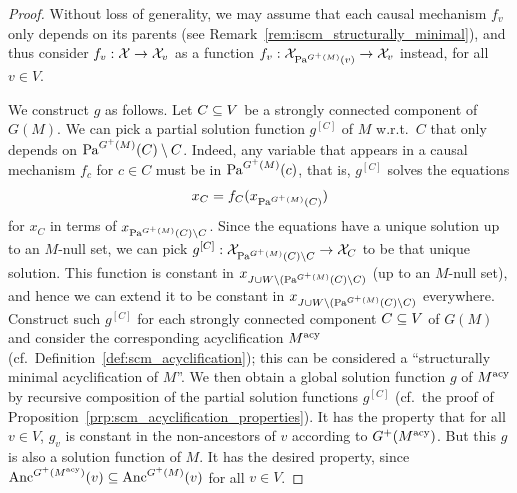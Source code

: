 \begin{proof}
  Without loss of generality, we may assume that each causal mechanism $f_v$ only depends on its parents (see Remark~\ref{rem:iscm_structurally_minimal}), and thus consider $f_v : \mathcal{X} \to \mathcal{X}_v$ as a function $f_v : \mathcal{X}_{\mathrm{Pa}^{G^+(M)}(v)} \to \mathcal{X}_v$ instead, for all $v \in V$.

  We construct $g$ as follows.
  Let $C \subseteq V$ be a strongly connected component of $G(M)$.
  We can pick a partial solution function $g^{[C]}$ of $M$ w.r.t.\ $C$ that only depends on $\mathrm{Pa}^{G^+(M)}(C) \setminus C$.
  Indeed, any variable that appears in a causal mechanism $f_c$ for $c \in C$ must be in $\mathrm{Pa}^{G^+(M)}(c)$, that is, $g^{[C]}$ solves the equations
  $$x_C = f_C(x_{\mathrm{Pa}^{G^+(M)}(C)})$$
  for $x_C$ in terms of $x_{\mathrm{Pa}^{G^+(M)}(C) \setminus C}$.
  Since the equations have a unique solution up to an $M$-null set, we can pick $g^{[C]} : \mathcal{X}_{\mathrm{Pa}^{G^+(M)}(C) \setminus C} \to \mathcal{X}_C$ to be that unique solution.
  This function is constant in $x_{J \cup W \setminus (\mathrm{Pa}^{G^+(M)}(C) \setminus C)}$ (up to an $M$-null set), and hence we can extend it to be constant in $x_{J \cup W \setminus (\mathrm{Pa}^{G^+(M)}(C) \setminus C)}$ everywhere.
  Construct such $g^{[C]}$ for each strongly connected component $C \subseteq V$ of $G(M)$ and consider the corresponding acyclification $M^{\mathrm{acy}}$ (cf.\ Definition~\ref{def:scm_acyclification}); this can be considered a ``structurally minimal acyclification of $M$''.
  We then obtain a global solution function $g$ of $M^{\mathrm{acy}}$ by recursive composition of the partial solution functions $g^{[C]}$ (cf.\ the proof of Proposition~\ref{prp:scm_acyclification_properties}).
  It has the property that for all $v \in V$, $g_v$ is constant in the non-ancestors of $v$ according to $G^+(M^{\mathrm{acy}})$.
  But this $g$ is also a solution function of $M$.
  It has the desired property, since $\mathrm{Anc}^{G^+(M^{\mathrm{acy}})}(v) \subseteq \mathrm{Anc}^{G^+(M)}(v)$ for all $v \in V$.
%

\end{proof}
